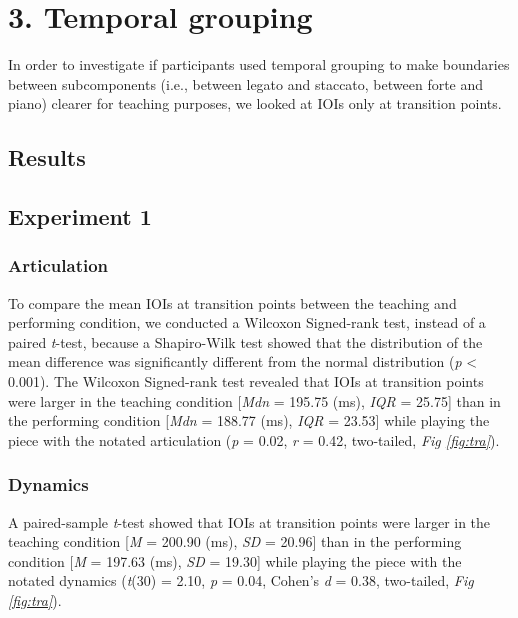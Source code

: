 \documentclass[
  man,floatsintext]{apa6}
\begin{document}
\clearpage

\hypertarget{temporal-grouping}{%
\section{3. Temporal grouping}\label{temporal-grouping}}

In order to investigate if participants used temporal grouping to make boundaries between subcomponents (i.e., between legato and staccato, between forte and piano) clearer for teaching purposes, we looked at IOIs only at transition points.

\hypertarget{results-3}{%
\subsection{Results}\label{results-3}}

\hypertarget{experiment-1-3}{%
\subsection{Experiment 1}\label{experiment-1-3}}

\hypertarget{articulation-4}{%
\subsubsection{Articulation}\label{articulation-4}}

To compare the mean IOIs at transition points between the teaching and performing condition, we conducted a Wilcoxon Signed-rank test, instead of a paired \emph{t}-test, because a Shapiro-Wilk test showed that the distribution of the mean difference was significantly different from the normal distribution (\emph{p} \textless{} 0.001). The Wilcoxon Signed-rank test revealed that IOIs at transition points were larger in the teaching condition {[}\emph{Mdn} = 195.75 (ms), \emph{IQR} = 25.75{]} than in the performing condition {[}\emph{Mdn} = 188.77 (ms), \emph{IQR} = 23.53{]} while playing the piece with the notated articulation (\emph{p} = 0.02, \emph{r} = 0.42, two-tailed, \emph{Fig \ref{fig:tra}}).

\hypertarget{dynamics-4}{%
\subsubsection{Dynamics}\label{dynamics-4}}

A paired-sample \emph{t}-test showed that IOIs at transition points were larger in the teaching condition {[}\emph{M} = 200.90 (ms), \emph{SD} = 20.96{]} than in the performing condition {[}\emph{M} = 197.63 (ms), \emph{SD} = 19.30{]} while playing the piece with the notated dynamics (\emph{t}(30) = 2.10, \emph{p} = 0.04, Cohen's \emph{d} = 0.38, two-tailed, \emph{Fig \ref{fig:tra}}).
\end{document}
